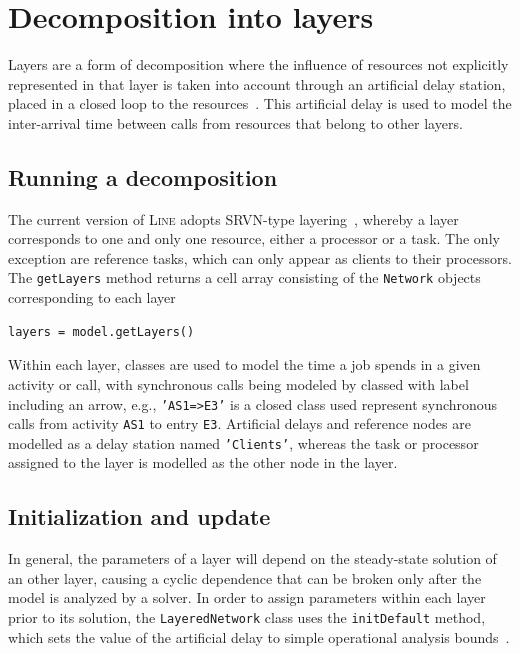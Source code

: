 \section{Decomposition into layers}
Layers are a form of decomposition where the influence of resources not explicitly represented in that layer is taken into account through an artificial delay station, placed in a closed loop to the resources~\cite{roli.sevc95}. This artificial delay is used to model the inter-arrival time between calls from resources that belong to other layers.

\subsection{Running a decomposition}
The current version of \textsc{Line} adopts SRVN-type layering~\cite{lqns12}, whereby a layer corresponds to one and only one resource, either a processor or a task. The only exception are reference tasks, which can only appear as clients to their processors.
The \texttt{getLayers} method returns a cell array consisting of the \texttt{Network} objects corresponding to each layer
\begin{lstlisting}
layers = model.getLayers()
\end{lstlisting}
Within each layer, classes are used to model the time a job spends in a given activity or call, with synchronous calls being modeled by classed with label including an arrow, e.g., \texttt{'AS1=>E3'} is a closed class used represent synchronous calls from activity \texttt{AS1} to entry \texttt{E3}. Artificial delays and reference nodes are modelled as a delay station named \texttt{'Clients'}, whereas the task or processor assigned to the layer is modelled as the other node in the layer.

\subsection{Initialization and update}
\label{initialization-and-update}
In general, the parameters of a layer will depend on the steady-state solution of an other layer, causing a cyclic dependence that can be broken only after the model is analyzed by a solver. In order to assign parameters within each layer prior to its solution, the \texttt{LayeredNetwork} class uses the \texttt{initDefault} method, which sets the value of the artificial delay to simple operational analysis bounds~\cite{LazZGS84}.

